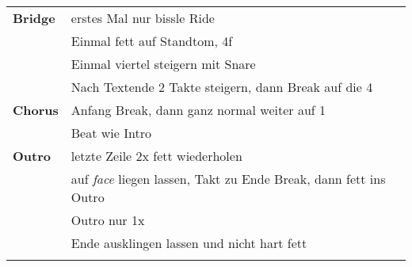 \begin{tabular}{p{1.6cm}l}
	\textbf{Bridge} & erstes Mal nur bissle Ride                                               \\
	                & Einmal fett auf Standtom, 4f                                             \\
	                & Einmal viertel steigern mit Snare                                        \\
	                & Nach Textende 2 Takte steigern, dann Break auf die 4                     \\
	\textbf{Chorus} & Anfang Break, dann ganz normal weiter auf 1                              \\
	                & Beat wie Intro                                                           \\
	\textbf{Outro}  & letzte Zeile 2x fett wiederholen                                         \\
	                & auf \textit{face} liegen lassen, Takt zu Ende Break, dann fett ins Outro \\
	                & Outro nur 1x                                                             \\
	                & Ende ausklingen lassen und nicht hart fett                               \\
	                &                                                                          \\
\end{tabular}
